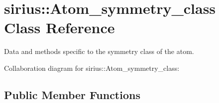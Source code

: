 \hypertarget{classsirius_1_1_atom__symmetry__class}{}\section{sirius\+:\+:Atom\+\_\+symmetry\+\_\+class Class Reference}
\label{classsirius_1_1_atom__symmetry__class}


Data and methods specific to the symmetry class of the atom.  




Collaboration diagram for sirius\+:\+:Atom\+\_\+symmetry\+\_\+class\+:
\subsection*{Public Member Functions}
